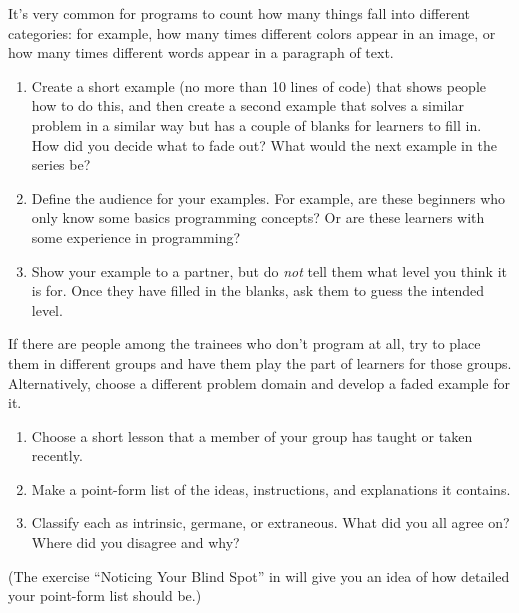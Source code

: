 It's very common for programs to count how many things fall into different categories:
for example,
how many times different colors appear in an image,
or how many times different words appear in a paragraph of text.

\begin{enumerate}
\item
  Create a short example (no more than 10 lines of code) that shows people how to do this,
  and then create a second example that solves a similar problem in a similar way
  but has a couple of blanks for learners to fill in.
  How did you decide what to fade out?
  What would the next example in the series be?

\item
  Define the audience for your examples.
  For example,
  are these beginners who only know some basics programming concepts?
  Or are these learners with some experience in programming?

\item
  Show your example to a partner,
  but do \emph{not} tell them what level you think it is for.
  Once they have filled in the blanks,
  ask them to guess the intended level.

\end{enumerate}

If there are people among the trainees who don't program at all,
try to place them in different groups
and have them play the part of learners for those groups.
Alternatively,
choose a different problem domain and develop a faded example for it.


\begin{enumerate}

\item
  Choose a short lesson that a member of your group has taught or taken recently.

\item
  Make a point-form list of the ideas, instructions, and explanations it contains.

\item
  Classify each as intrinsic, germane, or extraneous.
  What did you all agree on?
  Where did you disagree and why?

\end{enumerate}

(The exercise ``Noticing Your Blind Spot'' in 
will give you an idea of how detailed your point-form list should be.)

